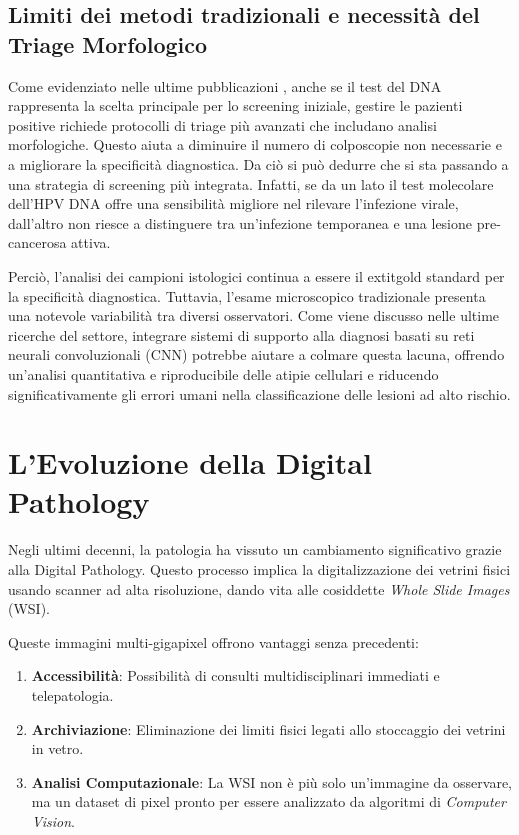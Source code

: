\subsection{Limiti dei metodi tradizionali e necessità del Triage Morfologico}
Come evidenziato nelle ultime pubblicazioni \cite{hpv_molecular_2025}, anche se il test del DNA rappresenta la scelta principale per lo screening iniziale, gestire le pazienti positive richiede protocolli di triage più avanzati che includano analisi morfologiche. Questo aiuta a diminuire il numero di colposcopie non necessarie e a migliorare la specificità diagnostica. Da ciò si può dedurre che si sta passando a una strategia di screening più integrata. Infatti, se da un lato il test molecolare dell'HPV DNA offre una sensibilità migliore nel rilevare l'infezione virale, dall'altro non riesce a distinguere tra un'infezione temporanea e una lesione pre-cancerosa attiva.

Perciò, l'analisi dei campioni istologici continua a essere il extit{gold standard} per la specificità diagnostica. Tuttavia, l'esame microscopico tradizionale presenta una notevole variabilità tra diversi osservatori. Come viene discusso nelle ultime ricerche del settore, integrare sistemi di supporto alla diagnosi basati su reti neurali convoluzionali (CNN) potrebbe aiutare a colmare questa lacuna, offrendo un'analisi quantitativa e riproducibile delle atipie cellulari e riducendo significativamente gli errori umani nella classificazione delle lesioni ad alto rischio.

 

\section{L'Evoluzione della Digital Pathology} Negli ultimi decenni, la patologia ha vissuto un cambiamento significativo grazie alla Digital Pathology. Questo processo implica la digitalizzazione dei vetrini fisici usando scanner ad alta risoluzione, dando vita alle cosiddette \textit{Whole Slide Images} (WSI).

Queste immagini multi-gigapixel offrono vantaggi senza precedenti: \begin{enumerate} \item \textbf{Accessibilità}: Possibilità di consulti multidisciplinari immediati e telepatologia. \item \textbf{Archiviazione}: Eliminazione dei limiti fisici legati allo stoccaggio dei vetrini in vetro. \item \textbf{Analisi Computazionale}: La WSI non è più solo un'immagine da osservare, ma un dataset di pixel pronto per essere analizzato da algoritmi di \textit{Computer Vision}. \end{enumerate}

